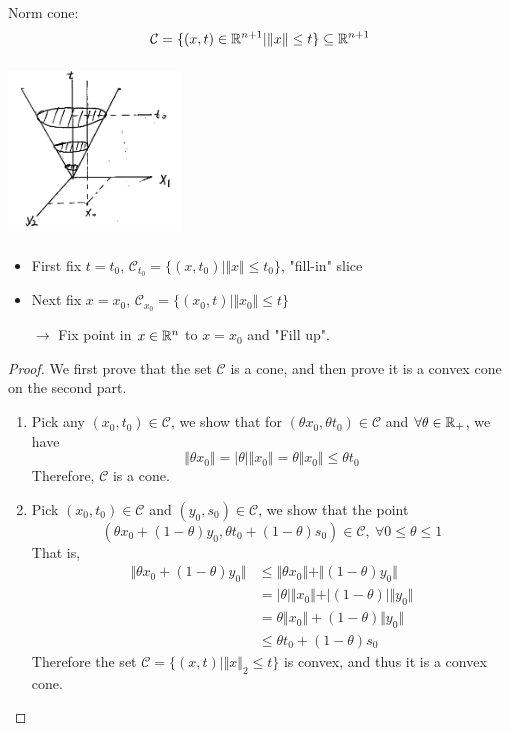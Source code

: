Norm cone:
\begin{equation*}
\mathcal{C} = \{(x,t)\in \mathbb{R}^{n+ 1} \vert \Vert x\Vert \leq t \} \subseteq \mathbb{R}^{n+1}
\end{equation*}


\begin{marginfigure}
\centering
\includegraphics[width=1.8in,height=1.8in]{figures/ch09/figure1118_1.png}
\end{marginfigure}

\begin{itemize}
	\item First fix $t = t_0$, $\mathcal{C}_{t_0} = \{(x,t_0)\vert \Vert x\Vert \leq t_0 \}$, "fill-in" slice
	
	\item Next fix $x = x_0$, $\mathcal{C}_{x_0} = \{(x_0,t)\vert \Vert x_0\Vert \leq t \}$
	
	$\rightarrow$  Fix point in $x\in \mathbb{R}^n$ to $x = x_0$ and "Fill up".
\end{itemize}


\begin{proof}
	We first prove that the set $\mathcal{C}$ is a cone, and then prove it is a convex cone on the second part.
	
	\begin{enumerate}
		\item Pick any $(x_0, t_0)\in \mathcal{C}$, we show that for $(\theta x_0, \theta t_0)\in \mathcal{C}$ and $\forall \theta \in \mathbb{R}_+$, we have
		$$\Vert \theta x_0\Vert = \vert \theta \vert \Vert x_0\Vert = \theta \Vert x_0\Vert \leq \theta t_0$$
		Therefore, $\mathcal{C}$ is a cone.
		
		\item Pick $(x_0, t_0)\in \mathcal{C}$ and $(y_0, s_0)\in \mathcal{C}$, we show that the point 
		$$(\theta x_0 + (1-\theta)y_0, \theta t_0 + (1-\theta)s_0)\in \mathcal{C},\ \forall 0\leq \theta \leq 1$$
		That is,
		\begin{align*}
		\Vert \theta x_0 + (1-\theta)y_0\Vert 
		&\leq \Vert \theta x_0\Vert + \Vert (1-\theta)y_0\Vert\\
		&= \vert \theta \vert \Vert x_0\Vert + \vert (1-\theta) \vert \Vert y_0\Vert\\
		&= \theta \Vert x_0\Vert +  (1-\theta)\Vert y_0\Vert\\
		&\leq \theta t_0 + (1-\theta)s_0
		\end{align*}
		Therefore the set $\mathcal{C} = \{(x,t)\vert \Vert x\Vert_2 \leq t \}$ is convex, and thus it is a convex cone.
		\end{enumerate}
		\end{proof}
		

